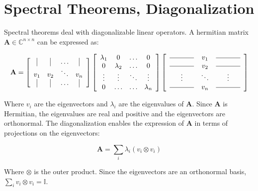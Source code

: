 \section{Spectral Theorems, Diagonalization}

Spectral theorems deal with diagonalizable linear operators. A hermitian matrix $\mathbf{A} \in \mathbb{C}^{n\times n}$ can be expressed as:

\begin{equation}
\mathbf{A} = \left[\begin{array}{cccc}
\vrule&\vrule&\hdots&\vrule\\
v_1&v_2&\ddots&v_n\\
\vrule&\vrule&\hdots&\vrule
\end{array}\right]\left[\begin{array}{cccc}
\lambda_1&0&\hdots&0\\ 
0&\lambda_2&\hdots&0\\
\vdots&\vdots&\ddots&\vdots\\
0&\hdots&\hdots&\lambda_n
\end{array}\right]
\left[
\begin{array}{ccc}
\rule[.5ex]{3.5em}{0.4pt}&v_1&\rule[.5ex]{3.5em}{0.4pt}\\
\rule[.5ex]{3.5em}{0.4pt}&v_2&\rule[.5ex]{3.5em}{0.4pt}\\
\vdots&\ddots&\vdots\\
\rule[.5ex]{3.5em}{0.4pt}&v_n&\rule[.5ex]{3.5em}{0.4pt}\\
\end{array}
\right]
\end{equation}

Where $v_i$ are the eigenvectors and $\lambda_i$ are the eigenvalues of $\mathbf{A}$. Since $\mathbf{A}$ is Hermitian, the eigenvalues are real and positive and the eigenvectors are orthonormal. The diagonalization enables the expression of $\mathbf{A}$ in terms of projections on the eigenvectors:

\begin{equation}
\mathbf{A} = \sum_i \lambda_i (v_i \otimes v_i)
\end{equation}

Where $\otimes$ is the outer product. Since the eigenvectors are an orthonormal basis, $\sum_i v_i \otimes v_i = \mathbb{I}$.